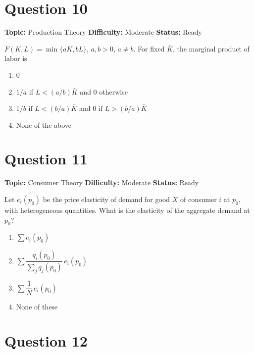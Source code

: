 \documentclass[11pt]{article}
\begin{document}
\newpage

\section*{Question 10}


\noindent\textbf{Topic:} Production Theory \quad \textbf{Difficulty:} Moderate \quad \textbf{Status:} Ready



$F(K,L) = \min\{aK, bL\}$, $a,b>0$, $a \neq b$. For fixed $\bar K$, the marginal product of labor is
\begin{enumerate}[label=(\Alph*)]
\item $0$
\item $1/a$ if $L < (a/b)\bar K$ and $0$ otherwise
\item $1/b$ if $L < (b/a)\bar K$ and $0$ if $L > (b/a)\bar K$
\item None of the above
\end{enumerate}

\newpage

\section*{Question 11}


\noindent\textbf{Topic:} Consumer Theory \quad \textbf{Difficulty:} Moderate \quad \textbf{Status:} Ready



Let $e_i(p_0)$ be the price elasticity of demand for good $X$ of consumer $i$ at $p_0$, with
heterogeneous quantities. What is the elasticity of the aggregate demand at $p_0$?
\begin{enumerate}[label=(\Alph*)]
\item $\sum e_i(p_0)$
\item $\sum \dfrac{q_i(p_0)}{\sum_j q_j(p_0)}\, e_i(p_0)$
\item $\sum \dfrac{1}{N}\, e_i(p_0)$
\item None of these
\end{enumerate}

\newpage

\section*{Question 12}

\end{document}

